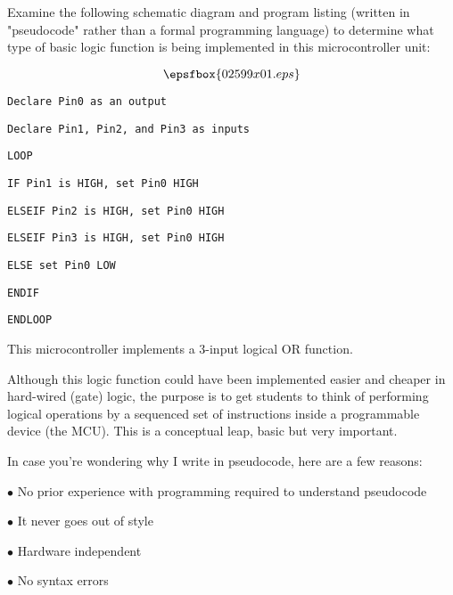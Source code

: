 

Examine the following schematic diagram and program listing (written in "pseudocode" rather than a formal programming language) to determine what type of basic logic function is being implemented in this microcontroller unit:

$$\epsfbox{02599x01.eps}$$

\noindent
{}

{\tt Declare Pin0 as an output}

{\tt Declare Pin1, Pin2, and Pin3 as inputs}

{\tt LOOP}

\hskip 10pt {\tt IF Pin1 is HIGH, set Pin0 HIGH}

\hskip 10pt {\tt ELSEIF Pin2 is HIGH, set Pin0 HIGH}

\hskip 10pt {\tt ELSEIF Pin3 is HIGH, set Pin0 HIGH}

\hskip 10pt {\tt ELSE set Pin0 LOW}

\hskip 10pt {\tt ENDIF}

{\tt ENDLOOP}

\vskip 10pt







This microcontroller implements a 3-input logical OR function.







Although this logic function could have been implemented easier and cheaper in hard-wired (gate) logic, the purpose is to get students to think of performing logical operations by a sequenced set of instructions inside a programmable device (the MCU).  This is a conceptual leap, basic but very important.

\vskip 10pt

In case you're wondering why I write in pseudocode, here are a few reasons:

\medskip
\goodbreak
\item{$\bullet$} No prior experience with programming required to understand pseudocode
\item{$\bullet$} It never goes out of style
\item{$\bullet$} Hardware independent
\item{$\bullet$} No syntax errors
\medskip

